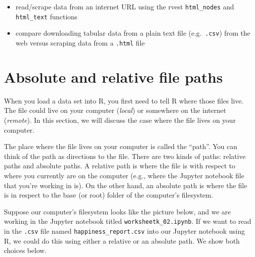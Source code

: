 \documentclass[
]{krantz}
\providecommand{\tightlist}{%
  \setlength{\itemsep}{0pt}\setlength{\parskip}{0pt}}
\begin{document}
\begin{itemize}
  \begin{itemize}
  \tightlist
  \item
    read/scrape data from an internet URL using the rvest \texttt{html\_nodes} and \texttt{html\_text} functions
  \item
    compare downloading tabular data from a plain text file (e.g.~\texttt{.csv}) from the web versus scraping data from a \texttt{.html} file
  \end{itemize}
\end{itemize}

\hypertarget{absolute-and-relative-file-paths}{%
\section{Absolute and relative file paths}\label{absolute-and-relative-file-paths}}

When you load a data set into R, you first need to tell R where those files live. The file could live on your
computer (\emph{local}) or somewhere on the internet (\emph{remote}). In this section, we will discuss the case where the file lives on your computer.

The place where the file lives on your computer is called the ``path''. You can think of the path as directions to the file. There are two kinds of
paths: relative paths and absolute paths. A relative path is where the file is with respect to where you currently are on the computer (e.g., where the
Jupyter notebook file that you're working in is). On the other hand, an absolute path is where the file is in respect to the base (or root) folder of
the computer's filesystem.

Suppose our computer's filesystem looks like the picture below, and we are working in the Jupyter notebook titled \texttt{worksheetk\_02.ipynb}. If we want to
read in the \texttt{.csv} file named \texttt{happiness\_report.csv} into our Jupyter notebook using R, we could do this using either a relative or an absolute path.
We show both choices below.
\end{document}
